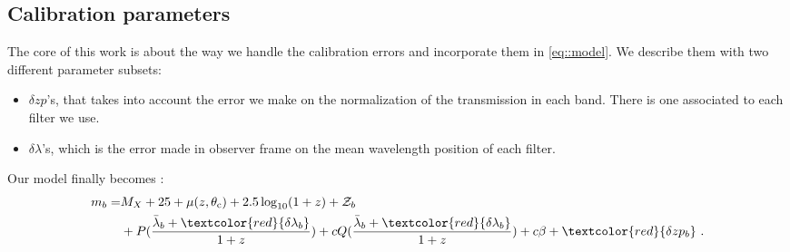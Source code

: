 \documentclass[\docopts]{\docclass}
\begin{document}

\subsection{Calibration parameters}
\label{subsec::calib_uncertainties}
The core of this work is about the way we handle the calibration errors and incorporate them in \ref{eq::model}.
We describe them with two different parameter subsets:
\begin{itemize}
\item $\delta zp$'s, that takes into account the error we make on the normalization of the transmission in each band.
There is one associated to each filter we use.
\item $\delta \lambda$'s, which is the error made in observer frame on the mean wavelength position of each filter. 
\end{itemize}

Our model finally becomes :
\begin{equation}
\begin{split}
m_b = & M_X + 25 + \mu(z, \theta_\text{c}) + 2.5\log_{10}(1+z) + \mathcal{Z}_b \\
&+ P(\frac{\bar\lambda_b  + \textcolor{red}{\delta\lambda_b}}{1+z}) + cQ(\frac{\bar\lambda_b  + \textcolor{red}{\delta\lambda_b}}{1+z}) + {c\beta} + \textcolor{red}{\delta zp_b} \text{ .}
\end{split}
\end{equation}
\end{document}
